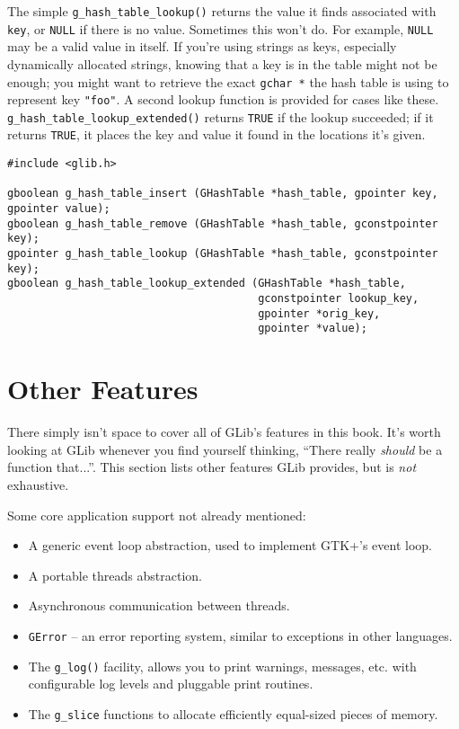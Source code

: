 The simple \lstinline{g_hash_table_lookup()} returns the value it finds associated with \lstinline{key}, or \lstinline{NULL} if there is no value. Sometimes this won't do. For example, \lstinline{NULL} may be a valid value in itself. If you're using strings as keys, especially dynamically allocated strings, knowing that a key is in the table might not be enough; you might want to retrieve the exact \lstinline{gchar *} the hash table is using to represent key \lstinline{"foo"}. A second lookup function is provided for cases like these. \lstinline{g_hash_table_lookup_extended()} returns \lstinline{TRUE} if the lookup succeeded; if it returns \lstinline{TRUE}, it places the key and value it found in the locations it's given.

\begin{lstlisting}[float, caption={Manipulating a \lstinline{GHashTable}}, label=glib-hashmanip]
#include <glib.h>

gboolean g_hash_table_insert (GHashTable *hash_table, gpointer key, gpointer value);
gboolean g_hash_table_remove (GHashTable *hash_table, gconstpointer key);
gpointer g_hash_table_lookup (GHashTable *hash_table, gconstpointer key);
gboolean g_hash_table_lookup_extended (GHashTable *hash_table,
                                       gconstpointer lookup_key,
                                       gpointer *orig_key,
                                       gpointer *value);
\end{lstlisting}

\section{Other Features}

There simply isn't space to cover all of GLib's features in this book. It's worth looking at GLib whenever you find yourself thinking, ``There really \emph{should} be a function that...''. This section lists other features GLib provides, but is \emph{not} exhaustive.

Some core application support not already mentioned:
\begin{itemize}
  \item A generic event loop abstraction, used to implement GTK+'s event loop.
  \item A portable threads abstraction.
  \item Asynchronous communication between threads.
  \item \lstinline{GError} -- an error reporting system, similar to exceptions in other languages.
  \item The \lstinline{g_log()} facility, allows you to print warnings, messages, etc. with configurable log levels and pluggable print routines.
  \item The \lstinline{g_slice} functions to allocate efficiently equal-sized pieces of memory.
\end{itemize}

